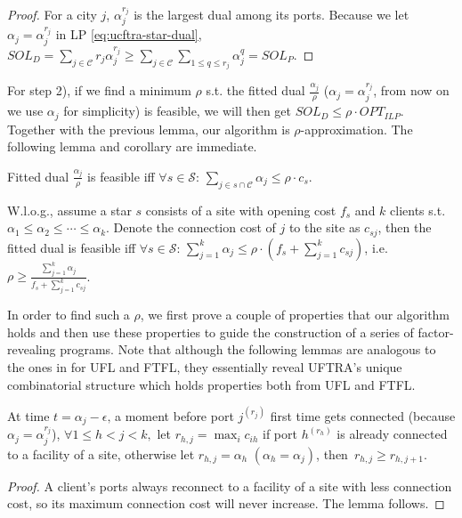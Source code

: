 \documentclass[10pt]{llncs}
\begin{document}
\begin{proof}
For a city $j$, $\alpha_{j}^{r_{j}}$ is the largest dual among its
ports. Because we let $\alpha_{j}=\alpha_{j}^{r_{j}}$ in LP \eqref{eq:ucftra-star-dual},
$SOL_{D}=\sum_{j\in\mathcal{C}}r_{j}\alpha_{j}^{r_{j}}\geq\sum_{j\in\mathcal{C}}\sum_{1\leq q\leq r_{j}}\alpha_{j}^{q}=SOL_{P}$.
\end{proof}
For step 2), if we find a minimum $\rho$ s.t. the fitted dual $\frac{\alpha_{j}}{\rho}$
($\alpha_{j}=\alpha_{j}^{r_{j}}$, from now on we use $\alpha_{j}$
for simplicity) is feasible, we will then get $SOL_{D}\leq\rho\cdot OPT_{ILP}$.
Together with the previous lemma, our algorithm is $\rho$-approximation.
The following lemma and corollary are immediate.
\begin{lemma}
Fitted dual $\frac{\alpha_{j}}{\rho}$ is feasible iff $\forall s\in\mathcal{S}:\,\sum_{j\in s\cap\mathcal{C}}\alpha_{j}{\displaystyle \leq\rho\cdot c_{s}}$.\end{lemma}
\begin{corollary}
W.l.o.g., assume a star $s$ consists of a site with opening cost
$f_{s}$ and $k$ clients s.t. $\alpha_{1}\leq\alpha_{2}\leq\cdots\leq\alpha_{k}$.
Denote the connection cost of $j$ to the site as $c_{sj}$, then
the fitted dual is feasible iff $\forall s\in\mathcal{S}:\,\sum_{j=1}^{k}\alpha_{j}\leq\rho\cdot\left(f_{s}+\sum_{j=1}^{k}c_{sj}\right)$,
i.e. $\rho\geq\frac{\sum_{j=1}^{k}\alpha_{j}}{f_{s}+\sum_{j=1}^{k}c_{sj}}$.\label{cor:1}
\end{corollary}
In order to find such a $\rho$, we first prove a couple of properties
that our algorithm holds and then use these properties to guide the
construction of a series of factor-revealing programs. Note that although
the following lemmas are analogous to the ones in \cite{Jain03dualfitting,Swamy08FTFL2.076}
for UFL and FTFL, they essentially reveal UFTRA's unique combinatorial
structure which holds properties both from UFL and FTFL.
\begin{lemma}
At time $t=\alpha_{j}-\epsilon,\,$a moment before port $j^{\left(r_{j}\right)}$
first time gets connected (because $\alpha_{j}=\alpha_{j}^{r_{j}}$),
$\forall1\leq h<j<k,$ let $r_{h,j}=\max_{i}c_{ih}$ if port $h^{\left(r_{h}\right)}$
is already connected to a facility of a site, otherwise let $r_{h,j}=\alpha_{h}$
$\left(\alpha_{h}=\alpha_{j}\right)$, then $\, r_{h,j}\geq r_{h,j+1}$.\label{lem:r}\end{lemma}
\begin{proof}
A client's ports always reconnect to a facility of a site with less
connection cost, so its maximum connection cost will never increase.
The lemma follows.\end{proof}
\end{document}
